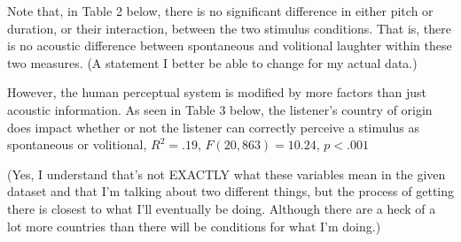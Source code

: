 \documentclass[
]{article}
\begin{document}
Note that, in Table 2 below, there is no significant difference in
either pitch or duration, or their interaction, between the two stimulus
conditions. That is, there is no acoustic difference between spontaneous
and volitional laughter within these two measures. (A statement I better
be able to change for my actual data.)

However, the human perceptual system is modified by more factors than
just acoustic information. As seen in Table 3 below, the listener's
country of origin does impact whether or not the listener can correctly
perceive a stimulus as spontaneous or volitional, \(R^2 = .19\),
\(F(20, 863) = 10.24\), \(p < .001\)

(Yes, I understand that's not EXACTLY what these variables mean in the
given dataset and that I'm talking about two different things, but the
process of getting there is closest to what I'll eventually be doing.
Although there are a heck of a lot more countries than there will be
conditions for what I'm doing.)
\end{document}
